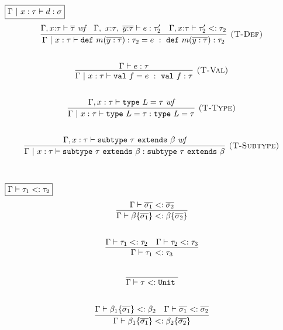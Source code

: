 \documentclass{article}
\newcommand{\keywadj}[1]{\mathtt{#1}}
\newcommand{\keyw}[1]{\keywadj{#1}~}
\begin{document}
$\fbox{$\Gamma ~|~ x:\tau \vdash d : \sigma$}$
\[
\begin{array}{c}
\infer[\textsc{(T-Def)}]
  {\Gamma  ~|~ x:\tau \vdash \keyw{def} m(\overline{y : \tau}) : \tau_2 = e~:~\keyw{def} m(\overline{y : \tau}) : \tau_2}
  {\Gamma, x{:}\tau \vdash \overline{\tau}~\textit{wf} & \Gamma,~x{:}\tau,~\overline{y{:}\tau} \vdash e : \tau_2' & \Gamma, x{:}\tau \vdash \tau_2' <: \tau_2}\\[5ex]

\infer[\textsc{(T-Val)}]
  {\Gamma ~|~ x:\tau \vdash \keyw{val} f = e~:~\keyw{val} f : \tau}
  {\Gamma \vdash e : \tau}\\[5ex]

\infer[\textsc{(T-Type)}]
  {\Gamma ~|~ x:\tau \vdash \keyw{type} L = \tau : \keyw{type} L = \tau}
  {\Gamma, x:\tau \vdash \keyw{type} L = \tau~\textit{wf}}\\[5ex]

\infer[\textsc{(T-Subtype)}]
  {\Gamma ~|~ x:\tau \vdash \keyw{subtype} \tau ~\keyw{extends} \beta : \keyw{subtype} \tau ~\keyw{extends} \beta}
  {\Gamma, x:\tau \vdash \keyw{subtype} \tau ~\keyw{extends} \beta~\textit{wf}}\\[5ex]
  
\end{array}
\]

$\fbox{$\Gamma \vdash \tau_1 <: \tau_2$}$
\[
\begin{array}{c}

\infer
  {\Gamma \vdash \beta\{\overline{\sigma_1}\} <: \beta\{\overline{\sigma_2}\}}
  {\Gamma \vdash \overline{\sigma_1} <: \overline{\sigma_2}}\\[5ex]

\infer
  {\Gamma \vdash \tau_1 <: \tau_3}
  {\Gamma \vdash \tau_1 <: \tau_2 & \Gamma \vdash \tau_2 <: \tau_3}\\[5ex]

\infer
  {\Gamma \vdash \tau <: \keyw{Unit} }
  {}\\[5ex]

\infer
  {\Gamma \vdash \beta_1\{\overline{\sigma_1}\} <: \beta_2\{\overline{\sigma_2}\}}
  {\Gamma \vdash \beta_1\{\overline{\sigma_1}\} <: \beta_2 & \Gamma \vdash \overline{\sigma_1} <: \overline{\sigma_2}}\\[5ex]
  
\end{array}
\]
\end{document}

